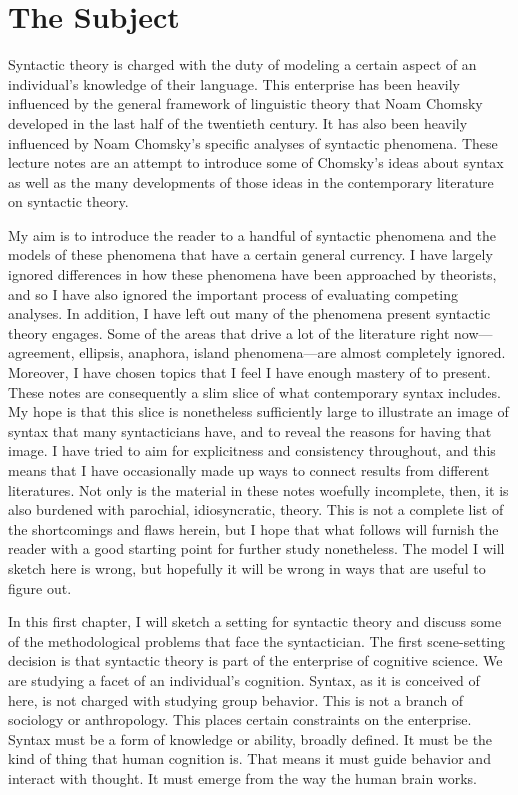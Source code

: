 \chapter{The Subject}
\label{ch:subject}
\thispagestyle{empty}

\noindent
Syntactic theory is charged with the duty of modeling a certain aspect of an individual's knowledge of their language. This enterprise has been heavily influenced by the general framework of linguistic theory that Noam Chomsky developed in the last half of the twentieth century. It has also been heavily influenced by Noam Chomsky's specific analyses of syntactic phenomena. These lecture notes are an attempt to introduce some of Chomsky's ideas about syntax as well as the many developments of those ideas in the contemporary literature on syntactic theory.

My aim is to introduce the reader to a handful of syntactic phenomena and the models of these phenomena that have a certain general currency. I have largely ignored differences in how these phenomena have been approached by theorists, and so I have also ignored the important process of evaluating competing analyses. In addition, I have left out many of the phenomena present syntactic theory engages. Some of the areas that drive a lot of the literature right now---agreement, ellipsis, anaphora, island phenomena---are almost completely ignored. Moreover, I have chosen topics that I feel I have enough mastery of to present. These notes are consequently a slim slice of what contemporary syntax includes. My hope is that this slice is nonetheless sufficiently large to illustrate an image of syntax that many syntacticians have, and to reveal the reasons for having that image. I have tried to aim for explicitness and consistency throughout, and this means that I have occasionally made up ways to connect results from different literatures. Not only is the material in these notes woefully incomplete, then, it is also burdened with parochial, idiosyncratic, theory. This is not a complete list of the shortcomings and flaws herein, but I hope that what follows will furnish the reader with a good starting point for further study nonetheless. The model I will sketch here is wrong, but hopefully it will be wrong in ways that are useful to figure out.

In this first chapter, I will sketch a setting for syntactic theory and discuss some of the methodological problems that face the syntactician. The first scene-setting decision is that syntactic theory is part of the enterprise of cognitive science. We are studying a facet of an individual's cognition. Syntax, as it is conceived of here, is not charged with studying group behavior. This is not a branch of sociology or anthropology. This places certain constraints on the enterprise. Syntax must be a form of knowledge or ability, broadly defined. It must be the kind of thing that human cognition is. That means it must guide behavior and interact with thought. It must emerge from the way the human brain works.

